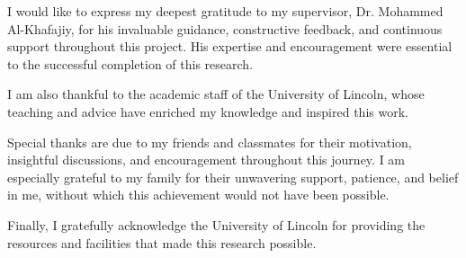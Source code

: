 \begin{acknowledgements}

I would like to express my deepest gratitude to my supervisor, Dr. Mohammed Al-Khafajiy, for his invaluable guidance, constructive feedback, and continuous support throughout this project. His expertise and encouragement were essential to the successful completion of this research.

I am also thankful to the academic staff of the University of Lincoln, whose teaching and advice have enriched my knowledge and inspired this work.

Special thanks are due to my friends and classmates for their motivation, insightful discussions, and encouragement throughout this journey. I am especially grateful to my family for their unwavering support, patience, and belief in me, without which this achievement would not have been possible.

Finally, I gratefully acknowledge the University of Lincoln for providing the resources and facilities that made this research possible.

\end{acknowledgements}
